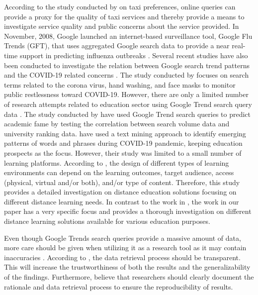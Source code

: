 \documentclass[11pt,a4paper,]{article}
\begin{document}
According to the study conducted by \textcite{willis2020using} on taxi preferences, online queries can provide a proxy for the quality of taxi services and thereby provide a means to investigate service quality and public concerns about the service provided. In November, 2008, Google launched an internet-based surveillance tool, Google Flu Trends (GFT), that uses aggregated Google search data to provide a near real-time support in predicting influenza outbreaks \autocite{cook2011assessing}. Several recent studies have also been conducted to investigate the relation between Google search trend patterns and the COVID-19 related concerns \autocite{husnayain2020applications,effenberger2020association}. The study conducted by \textcite{husnayain2020applications} focuses on search terms related to the corona virus, hand washing, and face masks to monitor public restlessness toward COVID-19. However, there are only a limited number of research attempts related to education sector using Google Trend search query data \autocite{vaughan2014web}. The study conducted by \textcite{vaughan2014web} have used Google Trend search queries to predict academic fame by testing the correlation between search volume data and university ranking data. \textcite{kansal2021google} have used a text mining approach to identify emerging patterns of words and phrases during COVID-19 pandemic, keeping education prospects as the focus. However, their study was limited to a small number of learning platforms. According to \textcite{moore2011learning}, the design of different types of learning environments can depend on the learning outcomes, target audience, access (physical, virtual and/or both), and/or type of content. Therefore, this study provides a detailed investigation on distance education solutions focusing on different distance learning needs. In contrast to the work in \textcite{kansal2021google}, the work in our paper has a very specific focus and provides a thorough investigation on different distance learning solutions available for various education purposes.

Even though Google Trends search queries provide a massive amount of data, more care should be given when utilizing it as a research tool as it may contain inaccuracies \autocite{carneiro2009google}. According to \textcite{nuti2014use}, the data retrieval process should be transparent. This will increase the trustworthiness of both the results and the generalizability of the findings. Furthermore, \textcite{nuti2014use} believe that researchers should clearly document the rationale and data retrieval process to ensure the reproducibility of results.
\end{document}
